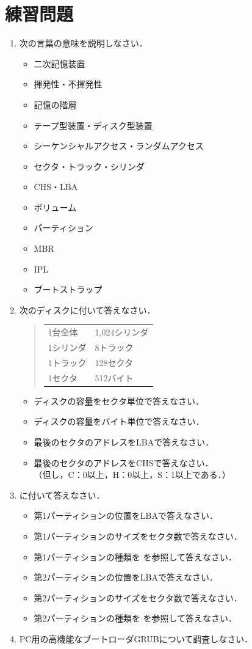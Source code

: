 \section*{練習問題}
\begin{enumerate}
\item 次の言葉の意味を説明しなさい．
  \begin{itemize}
  \item 二次記憶装置
  \item 揮発性・不揮発性
  \item 記憶の階層
  \item テープ型装置・ディスク型装置
  \item シーケンシャルアクセス・ランダムアクセス
  \item セクタ・トラック・シリンダ
  \item CHS・LBA
  \item ボリューム
  \item パーティション
  \item MBR
  \item IPL
  \item ブートストラップ
  \end{itemize}

\item 次のディスクに付いて答えなさい．
  \begin{quote}
    \begin{tabular}{l l}
      1台全体   & 1,024シリンダ  \\
      1シリンダ & 8トラック      \\
      1トラック & 128セクタ      \\
      1セクタ   & 512バイト
    \end{tabular}
  \end{quote}
  \begin{itemize}
  \item ディスクの容量をセクタ単位で答えなさい．
  \item ディスクの容量をバイト単位で答えなさい．
  \item 最後のセクタのアドレスをLBAで答えなさい．
  \item 最後のセクタのアドレスをCHSで答えなさい．\\
    （但し，C：0以上，H：0以上，S：1以上である．）
  \end{itemize}

\item {}に付いて答えなさい．
  \begin{itemize}
  \item 第1パーティションの位置をLBAで答えなさい．
  \item 第1パーティションのサイズをセクタ数で答えなさい．
  \item 第1パーティションの種類を
    を参照して答えなさい．
  \item 第2パーティションの位置をLBAで答えなさい．
  \item 第2パーティションのサイズをセクタ数で答えなさい．
  \item 第2パーティションの種類を
    を参照して答えなさい．
  \end{itemize}

\item PC用の高機能なブートローダGRUBについて調査しなさい．
\end{enumerate}
